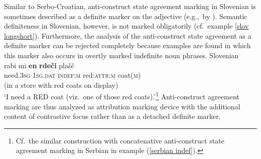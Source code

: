 Similar to Serbo-Croatian, anti\hyp{}construct state agreement marking in Slovenian is sometimes described as a definite marker on the adjective (e.g.,~by \citealt[411]{priestly1993}). Semantic definiteness in Slovenian, however, is not marked obligatorily (cf.~example \ref{slov longshort}). Furthermore, the analysis of the anti\hyp{}construct state agreement as a definite marker can be rejected completely because examples are found in which this marker also occurs in overtly marked indefinite noun phrases.
\ea
\rm{Slovenian \citep{marusic-etal2007}}\\
\gll 	rabi mi \textbf{en} \textbf{rde\v{c}i} pla\v{s}\v{c}\\
	need.\textsc{3sg} \textsc{1sg.dat} \textsc{indef:m} red:\textsc{attr:m} coat(\textsc{m})\\
\glt (in a store with red coats on display)\\‘I need a RED coat (viz.~one of those red coats).’\footnote{Cf.~the similar construction with concatenative anti\hyp{}construct state agreement marking in Serbian in example (\ref{serbian indef}).}
\z
Anti\hyp{}construct agreement marking are thus analyzed as attribution marking device with the additional content of contrastive focus rather than as a detached definite marker.

